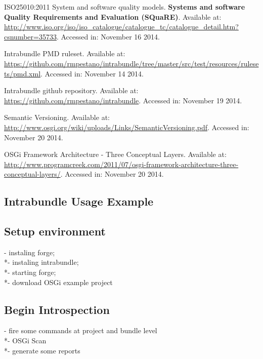 \documentclass[cic,tc,english]{iiufrgs} %
\begin{document}
\begin{thebibliography}{este-parametro-nao-eh-usado-pelo-estilo-ABNT}
 ISO25010:2011
System and software quality models. \textbf{Systems and software Quality Requirements and Evaluation (SQuaRE)}. Available at: \url{http://www.iso.org/iso/iso_catalogue/catalogue_tc/catalogue_detail.htm?csnumber=35733}. Accessed in: November 16 2014.

Intrabundle PMD ruleset. Available at: \url{https://github.com/rmpestano/intrabundle/tree/master/src/test/resources/rulesets/pmd.xml}. Accessed in: November 14 2014.

Intrabundle github repository. Available at: \url{https://github.com/rmpestano/intrabundle}. Accessed in: November 19 2014.

Semantic Versioning. Available at: \url{http://www.osgi.org/wiki/uploads/Links/SemanticVersioning.pdf}. Accessed in: November 20 2014.

OSGi Framework Architecture - Three Conceptual Layers. Available at: \url{http://www.programcreek.com/2011/07/osgi-framework-architecture-three-conceptual-layers/}. Accessed in: November 20 2014.


\end{thebibliography}

\begin{appendices}
\chapter{Intrabundle Usage Example}

\section{Setup environment}

- instaling forge;\\*- instaling intrabundle; \\*- starting forge;\\*- download OSGi example project 

\section{Begin Introspection}
- fire some commands at project and bundle level\\*- OSGi Scan \\*- generate some reports

\end{appendices}
\end{document}
